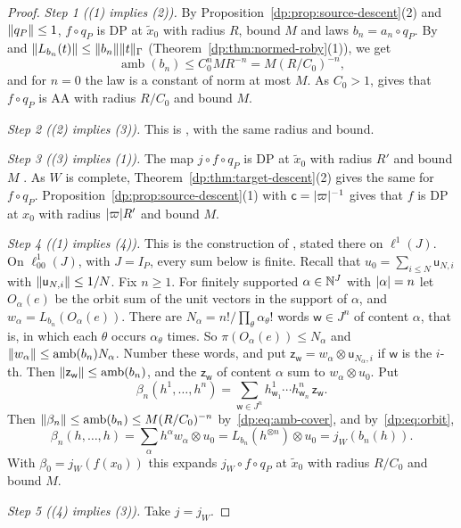 \begin{proof}
\emph{Step 1 ((1) implies (2)).} By Proposition~\ref{dp:prop:source-descent}(2) and $\lVert q_P\rVert\le1$, $f\circ q_P$ is DP at $\tilde x_0$ with radius $R$, bound $M$ and laws $b_n=a_n\circ q_P$. By \cite[Theorem~14.39(2)]{I} and $\lVert L_{b_n}(t)\rVert\le\lVert b_n\rVert\lVert t\rVert_\Gamma$ (Theorem~\ref{dp:thm:normed-roby}(1)), we get
\begin{equation}\label{dp:eq:amb-cover}
 \operatorname{amb}(b_n)\le C_0^nMR^{-n}=M(R/C_0)^{-n},
\end{equation}
and for $n=0$ the law is a constant of norm at most $M$. As $C_0>1$, \cite[Proposition~14.9(1)]{I} gives that $f\circ q_P$ is AA with radius $R/C_0$ and bound $M$.

\emph{Step 2 ((2) implies (3)).} This is \cite[Remark~14.13]{I}, with the same radius and bound.

\emph{Step 3 ((3) implies (1)).} The map $j\circ f\circ q_P$ is DP at $\tilde x_0$ with radius $R'$ and bound $M$ \cite[Proposition~14.9(1)]{I}. As $W$ is complete, Theorem~\ref{dp:thm:target-descent}(2) gives the same for $f\circ q_P$. Proposition~\ref{dp:prop:source-descent}(1) with $\mathsf c=\lvert \varpi\rvert^{-1}$ gives that $f$ is DP at $x_0$ with radius $\lvert \varpi\rvert R'$ and bound $M$.

\emph{Step 4 ((1) implies (4)).} This is the construction of \cite[Remark~14.41]{I}, stated there on $\ell^1(J)$. On $\ell^1_{00}(J)$, with $J=I_P$, every sum below is finite. Recall that $u_0=\sum_{i\le N}\mathsf u_{N,i}$ with $\lVert \mathsf u_{N,i}\rVert\le1/N$. Fix $n\ge1$. For finitely supported $\alpha\in\mathbb N^J$ with $\lvert \alpha\rvert=n$ let $O_\alpha(e)$ be the orbit sum of the unit vectors in the support of $\alpha$, and $w_\alpha=L_{b_n}(O_\alpha(e))$. There are $N_\alpha=n!/\prod_\theta\alpha_\theta!$ words $\mathsf w\in J^n$ of content $\alpha$, that is, in which each $\theta$ occurs $\alpha_\theta$ times. So $\pi(O_\alpha(e))\le N_\alpha$ and $\lVert w_\alpha\rVert\le\operatorname{amb}(b_n)N_\alpha$. Number these words, and put $\mathsf z_{\mathsf w}=w_\alpha\otimes\mathsf u_{N_\alpha,i}$ if $\mathsf w$ is the $i$-th. Then $\lVert \mathsf z_{\mathsf w}\rVert\le\operatorname{amb}(b_n)$, and the $\mathsf z_{\mathsf w}$ of content $\alpha$ sum to $w_\alpha\otimes u_0$. Put
\[
 \beta_n(h^1,\dots,h^n)=\sum_{\mathsf w\in J^n}h^1_{\mathsf w_1}\cdots h^n_{\mathsf w_n}\,\mathsf z_{\mathsf w}.
\]
Then $\lVert \beta_n\rVert\le\operatorname{amb}(b_n)\le M(R/C_0)^{-n}$ by~\eqref{dp:eq:amb-cover}, and by~\eqref{dp:eq:orbit},
\[
 \beta_n(h,\dots,h)=\sum_\alpha h^\alpha w_\alpha\otimes u_0=L_{b_n}(h^{\otimes n})\otimes u_0=j_W(b_n(h)).
\]
With $\beta_0=j_W(f(x_0))$ this expands $j_W\circ f\circ q_P$ at $\tilde x_0$ with radius $R/C_0$ and bound $M$.

\emph{Step 5 ((4) implies (3)).} Take $j=j_W$.
\end{proof}

